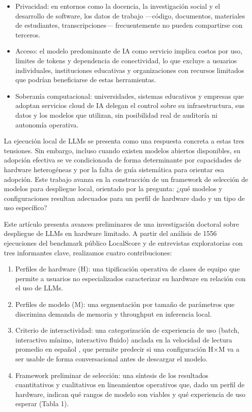 \documentclass{llncs}
\begin{document}
\begin{itemize}
    \item Privacidad: en entornos como la docencia, la investigación social y el desarrollo de software, los datos de trabajo —código, documentos, materiales de estudiantes, transcripciones— frecuentemente no pueden compartirse con terceros.
    \item Acceso: el modelo predominante de IA como servicio implica costos por uso, límites de tokens y dependencia de conectividad, lo que excluye a usuarios individuales, instituciones educativas y organizaciones con recursos limitados que podrían beneficiarse de estas herramientas.
    \item Soberanía computacional: universidades, sistemas educativos y empresas que adoptan servicios cloud de IA delegan el control sobre su infraestructura, sus datos y los modelos que utilizan, sin posibilidad real de auditoría ni autonomía operativa.
\end{itemize}

La ejecución local de LLMs se presenta como una respuesta concreta a estas tres tensiones. Sin embargo, incluso cuando existen modelos abiertos disponibles, su adopción efectiva se ve condicionada de forma determinante por capacidades de hardware heterogéneas y por la falta de guía sistemática para orientar esa adopción. Este trabajo avanza en la construcción de un framework de selección de modelos para despliegue local, orientado por la pregunta: ¿qué modelos y configuraciones resultan adecuados para un perfil de hardware dado y un tipo de uso específico?

Este artículo presenta avances preliminares de una investigación doctoral sobre despliegue de LLMs en hardware limitado. A partir del análisis de 1556 ejecuciones del benchmark público LocalScore y de entrevistas exploratorias con tres informantes clave, realizamos cuatro contribuciones:

\begin{enumerate}
    \item Perfiles de hardware (H): una tipificación operativa de clases de equipo que permite a usuarios no especializados caracterizar su hardware en relación con el uso de LLMs.
    \item Perfiles de modelo (M): una segmentación por tamaño de parámetros que discrimina demanda de memoria y throughput en inferencia local.
    \item Criterio de interactividad: una categorización de experiencia de uso (batch, interactivo mínimo, interactivo fluido) anclada en la velocidad de lectura promedio en español \parencite{brysbaert2019}, que permite predecir si una configuración H×M va a ser usable de forma conversacional antes de descargar el modelo.
    \item Framework preliminar de selección: una síntesis de los resultados cuantitativos y cualitativos en lineamientos operativos que, dado un perfil de hardware, indican qué rangos de modelo son viables y qué experiencia de uso esperar (Tabla 1).
\end{enumerate}
\end{document}
